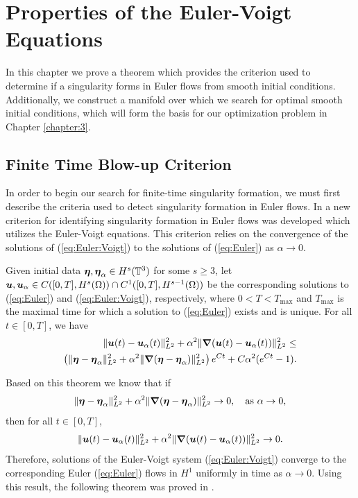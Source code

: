 \chapter{Properties of the Euler-Voigt Equations}\label{chapter:2}

In this chapter we prove a theorem which provides the criterion used to determine if a singularity forms in Euler flows from smooth initial conditions. Additionally, we construct a manifold over which we search for optimal smooth initial conditions, which will form the basis for our optimization problem in Chapter \ref{chapter:3}.

\section{Finite Time Blow-up Criterion}\label{sec:blowup:criterion}

In order to begin our search for finite-time singularity formation, we must first describe the criteria used to detect singularity formation in Euler flows. In \cite{larios_higher-order_2010} a new criterion for identifying singularity formation in Euler flows was developed which utilizes the Euler-Voigt equations. This criterion relies on the convergence of the solutions of (\ref{eq:Euler:Voigt}) to the solutions of (\ref{eq:Euler}) as $\alpha\rightarrow 0$. 
\begin{thm}\label{thm:Theorem:1.2}
Given initial data ${\boldsymbol \eta},{\boldsymbol \eta_\alpha} \in H^s(\mathbb{T}^3)$ for some $s\geq 3$, let $\boldsymbol u,\boldsymbol u_\alpha \in C([0,T],H^s(\Omega))\cap C^1([0,T],H^{s-1}(\Omega))$ be the corresponding solutions to (\ref{eq:Euler}) and (\ref{eq:Euler:Voigt}), respectively, where $0<T<T_{\text{max}}$ and $T_{\text{max}}$ is the maximal time for which a solution to (\ref{eq:Euler}) exists and is unique. For all $t\in[0,T]$, we have 
\begin{equation}
\begin{aligned}
\|\boldsymbol u(t)-\boldsymbol u_\alpha(t)\|_{L^2}^2 + \alpha^2\|{\boldsymbol \nabla}(\boldsymbol u(t)-\boldsymbol u_\alpha(t))\|_{L^2}^2 \leq \\ \left( \|{\boldsymbol \eta}-{\boldsymbol \eta_\alpha} \|_{L^2}^2 + \alpha^2\|{\boldsymbol \nabla}({\boldsymbol \eta} - {\boldsymbol \eta_\alpha})\|_{L^2}^2 \right)e^{Ct} + C\alpha^2(e^{Ct}-1).
\end{aligned}
\end{equation}
\end{thm}
\noindent Based on this theorem we know that if
\begin{equation}\label{eq:eta:0:condition}
\|{\boldsymbol \eta}-{\boldsymbol \eta_\alpha}\|_{L^2}^2+\alpha^2\|{\boldsymbol \nabla}({\boldsymbol \eta}-{\boldsymbol \eta_\alpha})\|_{L^2}^2 \rightarrow 0, \quad \text{as } \alpha\rightarrow 0,
\end{equation}
then for all $t\in [0,T]$,
\begin{equation}
\|\boldsymbol u(t)-\boldsymbol u_\alpha(t)\|_{L^2}^2 + \alpha^2\|{\boldsymbol \nabla}(\boldsymbol u(t)-\boldsymbol u_\alpha(t))\|_{L^2}^2 \rightarrow 0.
\end{equation}
Therefore, solutions of the Euler-Voigt system (\ref{eq:Euler:Voigt}) converge to the corresponding Euler (\ref{eq:Euler}) flows in $H^1$ uniformly in time as $\alpha\rightarrow 0$. Using this result, the following theorem was proved in \cite{larios_computational_2018}.

